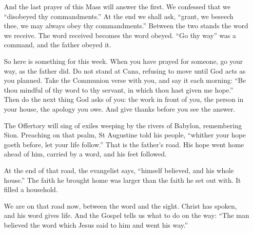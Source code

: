 And the last prayer of this Mass will answer the first. We confessed that we
``disobeyed thy commandments.'' At the end we shall ask, ``grant, we beseech
thee, we may always obey thy commandments.'' Between the two stands the word we
receive. The word received becomes the word obeyed. ``Go thy way'' was a
command, and the father obeyed it.

\medskip

So here is something for this week. When you have prayed for someone, go your
way, as the father did. Do not stand at Cana, refusing to move until God acts
as you planned. Take the Communion verse with you, and say it each morning:
``Be thou mindful of thy word to thy servant, in which thou hast given me
hope.'' Then do the next thing God asks of you: the work in front of you, the
person in your house, the apology you owe. And give thanks before you see the
answer.

The Offertory will sing of exiles weeping by the rivers of Babylon, remembering
Sion. Preaching on that psalm, St Augustine told his people, ``whither your
hope goeth before, let your life follow.'' That is the father's road. His hope
went home ahead of him, carried by a word, and his feet followed.

\medskip

At the end of that road, the evangelist says, ``himself believed, and his whole
house.'' The faith he brought home was larger than the faith he set out with.
It filled a household.

We are on that road now, between the word and the sight. Christ has spoken, and
his word gives life. And the Gospel tells us what to do on the way: ``The man
believed the word which Jesus said to him and went his way.''
